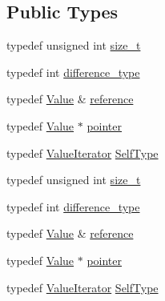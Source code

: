 \subsection*{Public Types}
\begin{DoxyCompactItemize}
\item 
typedef unsigned int \hyperlink{classJson_1_1ValueIterator_a308b8932ffc83eaa9d12dadd5c11a7dd}{size\-\_\-t}
\item 
typedef int \hyperlink{classJson_1_1ValueIterator_a2be1a9aa60bbfc8812e9dd1a7f1a8786}{difference\-\_\-type}
\item 
typedef \hyperlink{classJson_1_1Value}{Value} \& \hyperlink{classJson_1_1ValueIterator_ae87929b4567aa00372cf602c43b57160}{reference}
\item 
typedef \hyperlink{classJson_1_1Value}{Value} $\ast$ \hyperlink{classJson_1_1ValueIterator_acec45feb1ef1f3bf81240157d06d5432}{pointer}
\item 
typedef \hyperlink{classJson_1_1ValueIterator}{Value\-Iterator} \hyperlink{classJson_1_1ValueIterator_a23357670fdad61792670d86f62db7e16}{Self\-Type}
\item 
typedef unsigned int \hyperlink{classJson_1_1ValueIterator_a308b8932ffc83eaa9d12dadd5c11a7dd}{size\-\_\-t}
\item 
typedef int \hyperlink{classJson_1_1ValueIterator_a2be1a9aa60bbfc8812e9dd1a7f1a8786}{difference\-\_\-type}
\item 
typedef \hyperlink{classJson_1_1Value}{Value} \& \hyperlink{classJson_1_1ValueIterator_ae87929b4567aa00372cf602c43b57160}{reference}
\item 
typedef \hyperlink{classJson_1_1Value}{Value} $\ast$ \hyperlink{classJson_1_1ValueIterator_acec45feb1ef1f3bf81240157d06d5432}{pointer}
\item 
typedef \hyperlink{classJson_1_1ValueIterator}{Value\-Iterator} \hyperlink{classJson_1_1ValueIterator_a23357670fdad61792670d86f62db7e16}{Self\-Type}
\end{DoxyCompactItemize}
